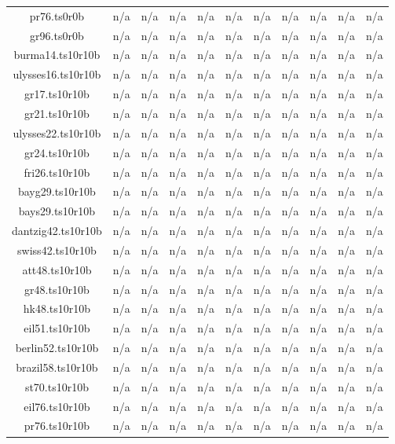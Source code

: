 \begin{table}[htbp]
\begin{tabular}{|ccccccccccc|}
pr76.ts0r0b & n/a & n/a & n/a & n/a & n/a & n/a & n/a & n/a & n/a & n/a \\
gr96.ts0r0b & n/a & n/a & n/a & n/a & n/a & n/a & n/a & n/a & n/a & n/a \\
burma14.ts10r10b & n/a & n/a & n/a & n/a & n/a & n/a & n/a & n/a & n/a & n/a \\
ulysses16.ts10r10b & n/a & n/a & n/a & n/a & n/a & n/a & n/a & n/a & n/a & n/a \\
gr17.ts10r10b & n/a & n/a & n/a & n/a & n/a & n/a & n/a & n/a & n/a & n/a \\
gr21.ts10r10b & n/a & n/a & n/a & n/a & n/a & n/a & n/a & n/a & n/a & n/a \\
ulysses22.ts10r10b & n/a & n/a & n/a & n/a & n/a & n/a & n/a & n/a & n/a & n/a \\
gr24.ts10r10b & n/a & n/a & n/a & n/a & n/a & n/a & n/a & n/a & n/a & n/a \\
fri26.ts10r10b & n/a & n/a & n/a & n/a & n/a & n/a & n/a & n/a & n/a & n/a \\
bayg29.ts10r10b & n/a & n/a & n/a & n/a & n/a & n/a & n/a & n/a & n/a & n/a \\
bays29.ts10r10b & n/a & n/a & n/a & n/a & n/a & n/a & n/a & n/a & n/a & n/a \\
dantzig42.ts10r10b & n/a & n/a & n/a & n/a & n/a & n/a & n/a & n/a & n/a & n/a \\
swiss42.ts10r10b & n/a & n/a & n/a & n/a & n/a & n/a & n/a & n/a & n/a & n/a \\
att48.ts10r10b & n/a & n/a & n/a & n/a & n/a & n/a & n/a & n/a & n/a & n/a \\
gr48.ts10r10b & n/a & n/a & n/a & n/a & n/a & n/a & n/a & n/a & n/a & n/a \\
hk48.ts10r10b & n/a & n/a & n/a & n/a & n/a & n/a & n/a & n/a & n/a & n/a \\
eil51.ts10r10b & n/a & n/a & n/a & n/a & n/a & n/a & n/a & n/a & n/a & n/a \\
berlin52.ts10r10b & n/a & n/a & n/a & n/a & n/a & n/a & n/a & n/a & n/a & n/a \\
brazil58.ts10r10b & n/a & n/a & n/a & n/a & n/a & n/a & n/a & n/a & n/a & n/a \\
st70.ts10r10b & n/a & n/a & n/a & n/a & n/a & n/a & n/a & n/a & n/a & n/a \\
eil76.ts10r10b & n/a & n/a & n/a & n/a & n/a & n/a & n/a & n/a & n/a & n/a \\
pr76.ts10r10b & n/a & n/a & n/a & n/a & n/a & n/a & n/a & n/a & n/a & n/a \\

\end{tabular}
\end{table}
